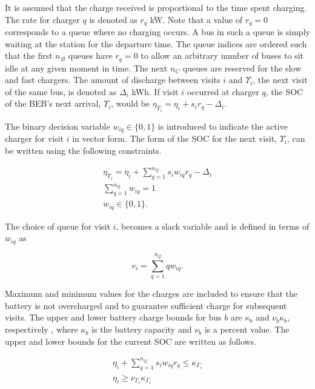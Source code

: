 \documentclass[ee,thesis]{usuthesis}
\begin{document}
It is assumed that the charge received is proportional to the time spent charging. The rate for charger \(q\) is denoted
as \(r_q\) kW. Note that a value of \(r_q = 0\) corresponds to a queue where no charging occurs. A bus in such a queue is
simply waiting at the station for the departure time. The queue indices are ordered such that the first \(n_B\) queues
have \(r_q = 0\) to allow an arbitrary number of buses to sit idle at any given moment in time. The next \(n_C\) queues are
reserved for the slow and fast chargers. The amount of discharge between visits \(i\) and \(\Upsilon_i\), the next visit of the
same bus, is denoted as \(\Delta_i\) kWh. If visit \(i\) occurred at charger \(q\), the SOC of the BEB's next arrival, \(\Upsilon_i\), would
be \(\eta_{\Upsilon_i} = \eta_i + s_i r_q - \Delta_i\).

The binary decision variable \(w_{iq} \in \{0,1\}\) is introduced to indicate the active charger for visit \(i\) in vector
form. The form of the SOC for the next visit, \(\Upsilon_i\), can be written using the following constraints.

\begin{subequations}
    \label{subeq:pre_next_charge}
\begin{align}
    \eta_{\Upsilon_i} = \eta_i + \sum_{q=1}^{n_Q} s_i w_{iq} r_q - \Delta_i \\
    \sum_{q=1}^{n_Q} w_{iq} = 1                           \\
    w_{iq} \in \{0,1\}.
\end{align}
\end{subequations}

The choice of queue for visit \(i\), becomes a slack variable and is defined in terms of \(w_{iq}\) as

\begin{equation}
    v_i = \sum_{q=1}^{n_Q} qw_{iq}.
\end{equation}

Maximum and minimum values for the charges are included to ensure that the battery is not overcharged and to guarantee
sufficient charge for subsequent visits. The upper and lower battery charge bounds for bus \(b\) are \(\kappa_b\) and \(\nu_b \kappa_b\),
respectively , where \(\kappa_b\) is the battery capacity and \(\nu_b\) is a percent value. The upper and lower bounds for the
current SOC are written as follows.

\begin{subequations}
    \label{subeq:pre_min_max}
\begin{align}
    \eta_i + \sum_{q=1}^{n_Q} s_i w_{iq} r_q \leq \kappa_{\Gamma_i} \label{eq:maxcharge}\\
    \eta_i \geq \nu_{\Gamma_i} \kappa_{\Gamma_i} \label{eq:mincharge}
\end{align}
\end{subequations}
\end{document}

